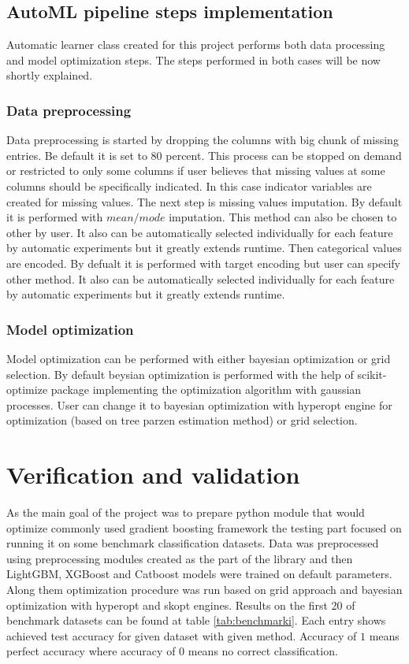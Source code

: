\documentclass[a4paper,twoside,12pt]{book}
\begin{document}
\section{AutoML pipeline steps implementation}
Automatic learner class created for this project performs both data processing and model optimization steps. The steps performed in both cases will be now shortly explained.
\subsection{Data preprocessing}
Data preprocessing is started by dropping the columns with big chunk of missing entries. Be default it is set to 80 percent. This process can be stopped on demand or restricted to only some columns if user believes that missing values at some columns should be specifically indicated. In this case indicator variables are created for missing values.
The next step is missing values imputation. By default it is performed with $mean/mode$ imputation. This method can also be chosen to other by user. It also can be automatically selected individually for each feature by automatic experiments but it greatly extends runtime.
Then categorical values are encoded. By defualt it is performed with target encoding but user can specify other method. It also can be automatically selected individually for each feature by automatic experiments but it greatly extends runtime.

\subsection{Model optimization}

Model optimization can be performed with either bayesian optimization or grid selection. By default beysian optimization is performed with the help of scikit-optimize package implementing the optimization algorithm with gaussian processes. 
User can change it to bayesian optimization with hyperopt engine for optimization (based on tree parzen estimation method) or grid selection.

\chapter{Verification and validation}


As the main goal of the project was to prepare python module that would optimize commonly used gradient boosting framework the testing part focused on running it on some benchmark classification datasets.
Data was preprocessed using preprocessing modules created as the part of the library and then LightGBM, XGBoost and Catboost models were trained on default parameters. Along them optimization procedure was run based on grid approach and bayesian optimization with hyperopt and skopt engines.
Results on the first 20 of benchmark datasets can be found at table  \ref{tab:benchmarki}. Each entry shows achieved test accuracy for given dataset with given method. Accuracy of $1$ means perfect accuracy where accuracy of $0$ means no correct classification.
\end{document}
